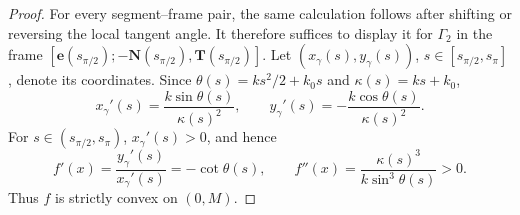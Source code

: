 \documentclass[10pt,a4paper]{amsart}
\begin{document}
\begin{proof}
  For every segment--frame pair, the same calculation follows after shifting
  or reversing the local tangent angle. It therefore suffices to display it
  for $\Gamma_2$ in the frame
  $[\boldsymbol{e}(s_{\pi/2});-\mathbf{N}(s_{\pi/2}),
  \mathbf{T}(s_{\pi/2})]$. Let
  $(x_\gamma(s),y_\gamma(s))$, $s\in[s_{\pi/2},s_\pi]$, denote its
  coordinates. Since $\theta(s)=ks^2/2+k_0s$ and
  $\kappa(s)=ks+k_0$,
  \begin{equation}
    \label{eq:derivative of para_gamma_2}
    x_\gamma'(s)=\frac{k\sin\theta(s)}{\kappa(s)^2},
    \qquad
    y_\gamma'(s)=-\frac{k\cos\theta(s)}{\kappa(s)^2}.
  \end{equation}
  For $s\in(s_{\pi/2},s_\pi)$, $x_\gamma'(s)>0$, and hence
  \begin{equation}
    \label{derivative of f}
    f'(x)=\frac{y_\gamma'(s)}{x_\gamma'(s)}=-\cot\theta(s),
    \qquad
    f''(x)=\frac{\kappa(s)^3}{k\sin^3\theta(s)}>0.
  \end{equation}
  Thus $f$ is strictly convex on $(0,M)$.
\end{proof}
\end{document}
